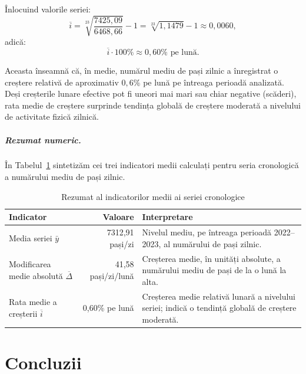 \documentclass[12pt,a4paper]{report}
\begin{document}
Înlocuind valorile seriei:
\[
\overline{i} = \sqrt[23]{\frac{7425{,}09}{6468{,}66}} - 1
= \sqrt[23]{1{,}1479} - 1 \approx 0{,}0060,
\]
adică:
\[
\overline{i} \cdot 100\% \approx 0{,}60\% \text{ pe lună}.
\]

Aceasta înseamnă că, în medie, numărul mediu de pași zilnic a înregistrat o creștere relativă de aproximativ \(0{,}6\%\) pe lună pe întreaga perioadă analizată. Deși creșterile lunare efective pot fi uneori mai mari sau chiar negative (scăderi), rata medie de creștere surprinde tendința globală de creștere moderată a nivelului de activitate fizică zilnică.

\paragraph{Rezumat numeric.}
În Tabelul~\ref{tab:rezumat-ind-medii-serie} sintetizăm cei trei indicatori medii calculați pentru seria cronologică a numărului mediu de pași zilnic.

\begin{table}[h!]
    \centering
    \caption{Rezumat al indicatorilor medii ai seriei cronologice}
    \label{tab:rezumat-ind-medii-serie}
    \begin{tabular}{l r p{7cm}}
        \hline
        \textbf{Indicator} & \textbf{Valoare} & \textbf{Interpretare} \\
        \hline
        Media seriei \(\bar{y}\) &
        7312{,}91 pași/zi &
        Nivelul mediu, pe întreaga perioadă 2022--2023, al numărului de pași zilnic. \\[2pt]
        
        Modificarea medie absolută \(\overline{\Delta}\) &
        41{,}58 pași/zi/lună &
        Creșterea medie, în unități absolute, a numărului mediu de pași de la o lună la alta. \\[2pt]
        
        Rata medie a creșterii \(\overline{i}\) &
        0{,}60\% pe lună &
        Creșterea medie relativă lunară a nivelului seriei; indică o tendință globală de creștere moderată. \\ 
        \hline
    \end{tabular}
\end{table}

\chapter*{Concluzii}
\end{document}

